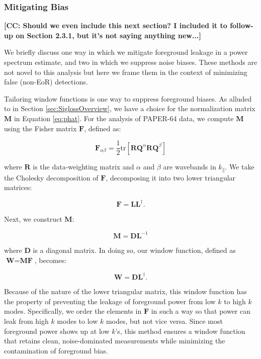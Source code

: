 \documentclass[preprint2,numberedappendix,tighten]{aastex6}  %
\newcommand{\cc}[1]{{\color{purple} \textbf{[CC: #1]}}}
\begin{document}
\subsubsection{Mitigating Bias}

\cc{Should we even include this next section? I included it to follow-up on Section 2.3.1, but it's not saying anything new...}

We briefly discuss one way in which we mitigate foreground leakage in a power spectrum estimate, and two in which we suppress noise biases. These methods are not novel to this analysis but here we frame them in the context of minimizing false (non-EoR) detections.

Tailoring window functions is one way to suppress foreground biases. As alluded to in Section \ref{sec:SiglossOverview}, we have a choice for the normalization matrix $\textbf{M}$ in Equation \eqref{eq:phat}. For the analysis of PAPER-64 data, we compute $\textbf{M}$ using the Fisher matrix $\textbf{F}$, defined as:

\begin{equation}
\textbf{F}_{\alpha\beta} = \frac{1}{2} \text{tr} [\textbf{R}\textbf{Q}^{\alpha}\textbf{R}\textbf{Q}^{\beta} ]
\end{equation}

\noindent where $\textbf{R}$ is the data-weighting matrix and $\alpha$ and $\beta$ are wavebands in $k_{\parallel}$. We take the Cholesky decomposition of $\textbf{F}$, decomposing it into two lower triangular matrices:

\begin{equation}
\textbf{F} = \textbf{LL}^{\dagger}.
\end{equation}

\noindent Next, we construct $\textbf{M}$:

\begin{equation}
\textbf{M} = \textbf{DL}^{-1}
\end{equation}

\noindent where $\textbf{D}$ is a diagonal matrix. In doing so, our window function, defined as $\textbf{W} = \textbf{MF}$, becomes:

\begin{equation}
\textbf{W} = \textbf{DL}^{\dagger}.
\end{equation}

\noindent Because of the nature of the lower triangular matrix, this window function has the property of preventing the leakage of foreground power from low $k$ to high $k$ modes. Specifically, we order the elements in $\textbf{F}$ in such a way so that power can leak from high $k$ modes to low $k$ modes, but not vice versa. Since most foreground power shows up at low $k$'s, this method ensures a window function that retains clean, noise-dominated measurements while minimizing the contamination of foreground bias.
\end{document}
